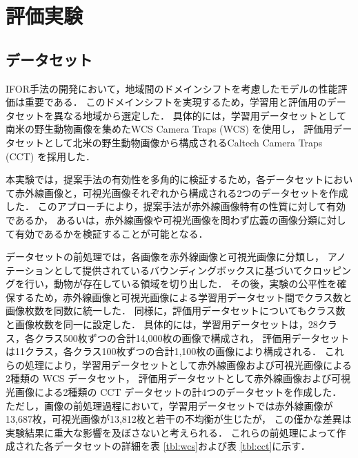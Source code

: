 \documentclass[a4paper,11pt,nomag]{jsreport}
\begin{document}
\setcounter{chapter}{4}

\chapter*{評価実験}

\section{データセット}

IFOR手法の開発において，地域間のドメインシフトを考慮したモデルの性能評価は重要である．
このドメインシフトを実現するため，学習用と評価用のデータセットを異なる地域から選定した．
具体的には，学習用データセットとして南米の野生動物画像を集めたWCS Camera Traps (WCS) \cite{wcs}を使用し，
評価用データセットとして北米の野生動物画像から構成されるCaltech Camera Traps (CCT) \cite{cct}を採用した．

本実験では，提案手法の有効性を多角的に検証するため，各データセットにおいて赤外線画像と，可視光画像それぞれから構成される2つのデータセットを作成した．
このアプローチにより，提案手法が赤外線画像特有の性質に対して有効であるか，
あるいは，赤外線画像や可視光画像を問わず広義の画像分類に対して有効であるかを検証することが可能となる．

データセットの前処理では，各画像を赤外線画像と可視光画像に分類し，
アノテーションとして提供されているバウンディングボックスに基づいてクロッピングを行い，動物が存在している領域を切り出した．
その後，実験の公平性を確保するため，赤外線画像と可視光画像による学習用データセット間でクラス数と画像枚数を同数に統一した．
同様に，評価用データセットについてもクラス数と画像枚数を同一に設定した．
具体的には，学習用データセットは，28クラス，各クラス500枚ずつの合計14,000枚の画像で構成され，
評価用データセットは11クラス，各クラス100枚ずつの合計1,100枚の画像により構成される．
これらの処理により，学習用データセットとして赤外線画像および可視光画像による2種類の WCS データセット，
評価用データセットとして赤外線画像および可視光画像による2種類の CCT データセットの計4つのデータセットを作成した．
ただし，画像の前処理過程において，学習用データセットでは赤外線画像が13,687枚，可視光画像が13,812枚と若干の不均衡が生じたが，
この僅かな差異は実験結果に重大な影響を及ぼさないと考えられる．
これらの前処理によって作成された各データセットの詳細を表 \ref{tbl:wcs}および表 \ref{tbl:cct}に示す．
\end{document}
